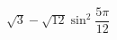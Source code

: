 \begin{ex}[type=type=expression]
	\begin{condition}
		\( \sqrt{3}-\sqrt{12}\sin^2\dfrac{5\pi}{12} \)
	\end{condition}
\end{ex}